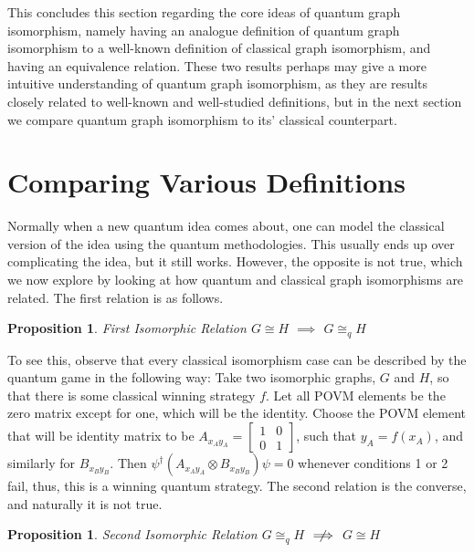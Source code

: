\documentclass[12pt]{article}
\newtheorem{proposition}[thm]{Proposition}
\begin{document}
This concludes this section regarding the core ideas of quantum graph
isomorphism, namely having an analogue definition of quantum graph
isomorphism to a well-known definition of classical graph isomorphism,
and having an equivalence relation. These two results perhaps may give
a more intuitive understanding of quantum graph isomorphism, as they
are results closely related to well-known and well-studied
definitions, but in the next section we compare quantum graph
isomorphism to its' classical counterpart.

\section{Comparing Various Definitions}
\label{sec:compare}

Normally when a new quantum idea comes about, one can model the
classical version of the idea using the quantum methodologies. This
usually ends up over complicating the idea, but it still
works. However, the opposite is not true, which we now explore by
looking at how quantum and classical graph isomorphisms are
related. The first relation is as follows.

\begin{proposition}{First Isomorphic Relation}
  \label{prop:isoimpliesqiso}
  $G \cong H$ $\implies$ $G \cong_q H$
\end{proposition}

To see this, observe that every classical isomorphism case can be
described by the quantum game in the following way: Take two
isomorphic graphs, $G$ and $H$, so that there is some classical
winning strategy $f$. Let all POVM elements be the zero matrix except
for one, which will be the identity. Choose the POVM element that will
be identity matrix to be $A_{x_Ay_A} =
\begin{bmatrix}
1 & 0 \\
0 & 1
\end{bmatrix}$, such that $y_A = f(x_A)$, and similarly for
$B_{x_By_B}$. Then $\psi^\dag(A_{x_Ay_A} \otimes B_{x_By_B})\psi = 0$
whenever conditions 1 or 2 fail, thus, this is a winning quantum
strategy.  The second relation is the converse, and naturally it is
not true.

\begin{proposition}{Second Isomorphic Relation}
  $G \cong_q H$ $\centernot\implies$ $G \cong H$
\end{proposition}
\end{document}
